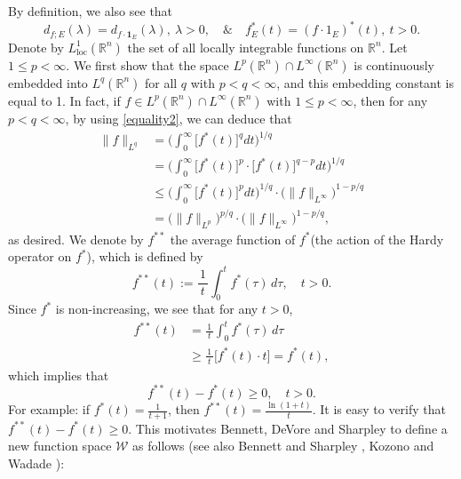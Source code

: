 \documentclass{birkjour}
\theoremstyle{definition}
\theoremstyle{remark}
\numberwithin{equation}{section}
\begin{document}
By definition, we also see that
\begin{equation*}
d_{f;E}(\lambda)=d_{f\cdot\mathbf{1}_E}(\lambda),~\lambda>0, \quad \& \quad f^{*}_{E}(t)=(f\cdot1_{E})^{*}(t),~t>0.
\end{equation*}
Denote by $L^1_{\mathrm{loc}}(\mathbb R^n)$ the set of all locally integrable functions on $\mathbb R^n$. Let $1\leq p<\infty$. We first show that the space $L^p(\mathbb R^n)\cap L^\infty(\mathbb R^n)$ is continuously embedded into $L^q(\mathbb R^n)$ for all $q$ with $p<q<\infty$, and this embedding constant is equal to 1. In fact, if $f\in L^p(\mathbb R^n)\cap L^\infty(\mathbb R^n)$ with $1\leq p<\infty$, then for any $p<q<\infty$, by using \eqref{equality2}, we can deduce that
\begin{equation*}
\begin{split}
\|f\|_{L^q}&=\bigg(\int_0^{\infty}\big[f^{*}(t)\big]^qdt\bigg)^{1/q}\\
&=\bigg(\int_0^{\infty}\big[f^{*}(t)\big]^p\cdot\big[f^{*}(t)\big]^{q-p}dt\bigg)^{1/q}\\
&\leq\bigg(\int_0^{\infty}\big[f^{*}(t)\big]^pdt\bigg)^{1/q}\cdot\big(\|f\|_{L^{\infty}}\big)^{1-p/q}\\
&=\big(\|f\|_{L^p}\big)^{p/q}\cdot\big(\|f\|_{L^\infty}\big)^{1-p/q},
\end{split}
\end{equation*}
as desired. We denote by $f^{**}$ the average function of $f^{*}$(the action of the Hardy operator on $f^{*}$), which is defined by
\begin{equation*}
f^{**}(t):=\frac{\,1\,}{t}\int_0^{t}f^{*}(\tau)\,d\tau,\quad t>0.
\end{equation*}
Since $f^{*}$ is non-increasing, we see that for any $t>0$,
\begin{equation*}
\begin{split}
f^{**}(t)&=\frac{\,1\,}{t}\int_0^{t}f^{*}(\tau)\,d\tau\\
&\geq\frac{\,1\,}{t}\big[f^{*}(t)\cdot t\big]=f^{*}(t),
\end{split}
\end{equation*}
which implies that
\begin{equation}\label{geq}
f^{**}(t)-f^{*}(t)\geq 0,\quad t>0.
\end{equation}
For example: if $f^{*}(t)=\frac{1}{t+1}$, then $f^{**}(t)=\frac{\ln(1+t)}{t}$. It is easy to verify that $f^{**}(t)-f^{*}(t)\geq 0$.
This motivates Bennett, DeVore and Sharpley \cite{be1} to define a new function space $\mathcal{W}$ as follows
(see also Bennett and Sharpley \cite{be2}, Kozono and Wadade \cite{Kozono2}):
\end{document}

